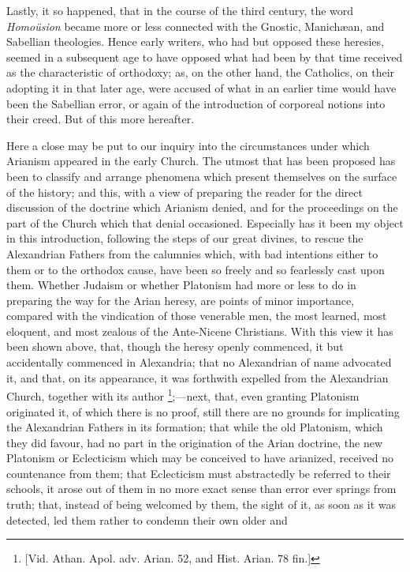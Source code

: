 Lastly, it so happened, that in the course of the third century,
the word \emph{Homoüsion} became more or less connected with the
Gnostic, Manichæan, and Sabellian theologies. Hence early writers,
who had but opposed these heresies, seemed in a subsequent age to have
opposed what had been by that time received as the characteristic of
orthodoxy; as, on the other hand, the Catholics, on their adopting it
in that later age, were accused of what in an earlier time would have
been the Sabellian error, or again of the introduction of corporeal
notions into their creed. But of this more hereafter.

Here a close may be put to our inquiry into the circumstances under
which Arianism appeared in the early Church. The utmost that has been
proposed has been to classify and arrange phenomena which present
themselves on the surface of the history; and this, with a view of
preparing the reader for the direct discussion of the doctrine which
Arianism denied, and for the proceedings on the part of the Church
which that denial occasioned. Especially has it been my object in this
introduction, following the steps of our great divines, to rescue the
Alexandrian Fathers from the calumnies which, with bad intentions
either to them or to the orthodox cause, have been so freely and so
fearlessly cast upon them. Whether Judaism or whether Platonism had
more or less to do in preparing the way for the Arian heresy, are
points of minor importance, compared with the vindication of those
venerable men, the most learned, most eloquent, and most zealous of
the Ante-Nicene Christians. With this view it has been shown above,
that, though the heresy openly commenced, it but accidentally
commenced in Alexandria; that no Alexandrian of name advocated it, and
that, on its appearance, it was forthwith expelled from the
Alexandrian Church, together with its author \footnote{[Vid. Athan. Apol. adv. Arian. 52, and
Hist. Arian. 78 fin.]};—next, that, even granting Platonism originated it, of which
there is no proof, still there are no grounds for implicating the
Alexandrian Fathers in its formation; that while the old Platonism,
which they did favour, had no part in the origination of the Arian
doctrine, the new Platonism or Eclecticism which may be conceived to
have arianized, received no countenance from them; that Eclecticism must abstractedly be referred to their schools, it arose
out of them in no more exact sense than error ever springs from truth;
that, instead of being welcomed by them, the sight of it, as soon as
it was detected, led them rather to condemn their own older and
